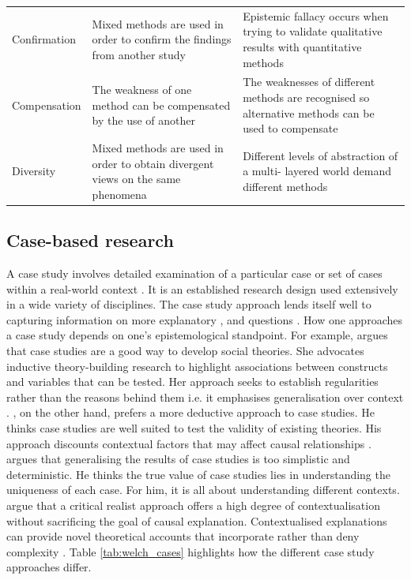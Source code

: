\begin{table}
{\begin{threeparttable}
\begin{tabular}{p{4cm}p{8cm}p{8cm}}
Confirmation & Mixed methods are used in order to confirm the findings from another study & Epistemic fallacy occurs when trying to validate qualitative results with quantitative methods \\
Compensation & The weakness of one method can be compensated by the use of another & The weaknesses of different methods are recognised so alternative methods can be used to compensate \\
Diversity & Mixed methods are used in order to obtain divergent views on the same phenomena & Different levels of abstraction of a multi- layered world demand different methods \\ \bottomrule
\end{tabular}\end{threeparttable}
%
}
\end{table}

\subsection{Case-based research}

A case study involves detailed examination of a particular case or set of cases within a real-world context \citep{crowe2011case}. It is an established research design used extensively in a wide variety of disciplines. The case study approach lends itself well to capturing information on more explanatory ,  and  questions \citep{crowe2011case}. How one approaches a case study depends on one's epistemological standpoint. For example, \citet{eisenhardt1989building} argues that case studies are a good way to develop social theories. She advocates inductive theory-building research to highlight associations between constructs and variables that can be tested. Her approach seeks to establish regularities rather than the reasons behind them i.e. it emphasises generalisation over context \citep{welch2011theorising}. \citet{yin2009case}, on the other hand, prefers a more deductive approach to case studies. He thinks case studies are well suited to test the validity of existing theories. His approach discounts contextual factors that may affect causal relationships \citep{welch2011theorising}. \citet{stake2005qualitative} argues that generalising the results of case studies is too simplistic and deterministic. He thinks the true value of case studies lies in understanding the uniqueness of each case. For him, it is all about understanding different contexts. \citet{welch2011theorising} argue that a critical realist approach offers a high degree of contextualisation without sacrificing the goal of causal explanation. Contextualised explanations can provide novel theoretical accounts that incorporate rather than deny complexity \citep{ragin2009reflections}. Table \ref{tab:welch_cases} highlights how the different case study approaches differ. \medskip

